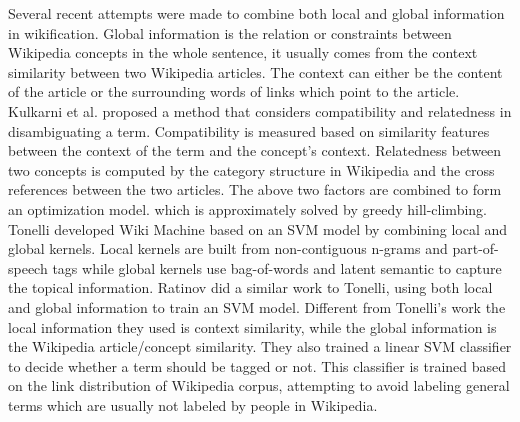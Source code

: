 Several recent attempts were made to combine both local and global information
in wikification.
Global information is the relation or constraints between Wikipedia
concepts in the whole sentence, it usually comes from the
context similarity between two Wikipedia articles.
The context can either be the content of the article or the
surrounding words of links which point to the article.
Kulkarni et al. \cite{kulkarni2009collective} proposed a method
that considers compatibility and relatedness in disambiguating a term.
Compatibility is measured based on similarity features between
the context of the term and the concept's context.
Relatedness between two concepts is computed by the category structure
in Wikipedia and the cross references between the two articles.
The above two factors are combined to form an optimization model.
which is approximately solved by greedy hill-climbing.
Tonelli \cite{Tonelli2012} developed Wiki Machine based on an SVM model
by combining local and global kernels. Local kernels are built from non-contiguous n-grams and
part-of-speech tags while global kernels use bag-of-words and latent
semantic to capture the topical information.
Ratinov \cite{RatinovRDA11} did a similar work to Tonelli, using both local
and global information to train an SVM model. Different from Tonelli's work
the local information they used is context similarity, while the
global information is the Wikipedia article/concept similarity.
They also trained a linear SVM classifier to decide
whether a term should be tagged or not.
This classifier is trained based on the link distribution of Wikipedia corpus,
attempting to avoid labeling general terms which are usually not labeled by people in Wikipedia.


